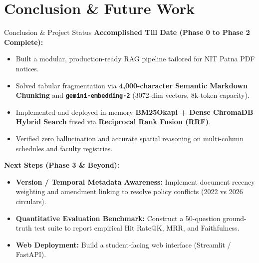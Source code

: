 \documentclass[11pt]{beamer}
\begin{document}
\section{Conclusion \& Future Work}
\begin{frame}{Conclusion \& Project Status}
    \textbf{Accomplished Till Date (Phase 0 to Phase 2 Complete):}
    \begin{itemize}
        \item Built a modular, production-ready RAG pipeline tailored for NIT Patna PDF notices.
        \item Solved tabular fragmentation via \textbf{4,000-character Semantic Markdown Chunking} and \textbf{\texttt{gemini-embedding-2}} (3072-dim vectors, 8k-token capacity).
        \item Implemented and deployed in-memory \textbf{BM25Okapi + Dense ChromaDB Hybrid Search} fused via \textbf{Reciprocal Rank Fusion (RRF)}.
        \item Verified zero hallucination and accurate spatial reasoning on multi-column schedules and faculty registries.
    \end{itemize}
    \vspace{4pt}
    \textbf{Next Steps (Phase 3 \& Beyond):}
    \begin{itemize}
        \item \textbf{Version / Temporal Metadata Awareness:} Implement document recency weighting and amendment linking to resolve policy conflicts (2022 vs 2026 circulars).
        \item \textbf{Quantitative Evaluation Benchmark:} Construct a 50-question ground-truth test suite to report empirical Hit Rate@K, MRR, and Faithfulness.
        \item \textbf{Web Deployment:} Build a student-facing web interface (Streamlit / FastAPI).
    \end{itemize}
\end{frame}
\end{document}
